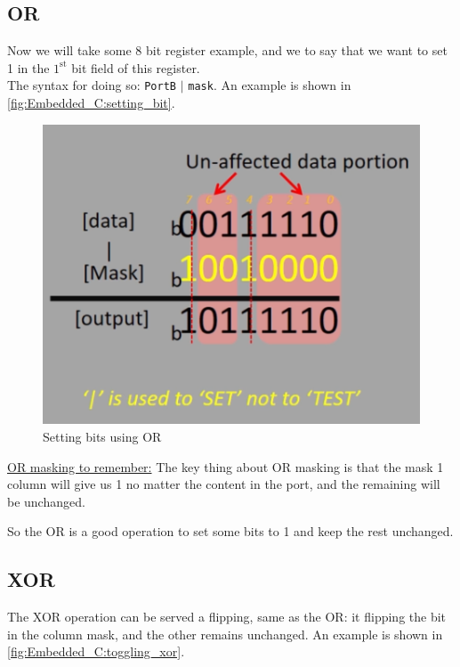 \newpage
\subsection{OR}

Now we will take some 8 bit register example, and we to say that we want to set 1 in the $\mathrm{1}^\mathrm{st}$ bit field of this register.\\

The syntax for doing so: \verb|PortB| $|$ \verb|mask|. An example is shown in \autoref{fig:Embedded_C:setting_bit}. 

\begin{figure}[h]
\centering
\includegraphics[scale=0.7]{Figures/Embedded_C/setting_bit}
\caption{Setting bits using OR}
\label{fig:Embedded_C:setting_bit}
\end{figure} 



\underline{OR masking to remember:} The key thing about OR masking is that the mask 1 column will give us 1 no matter the content in the port, and the remaining will be unchanged.

So the OR is a good operation to set some bits to 1 and keep the rest unchanged.

\subsection{XOR}

The XOR operation can be served a flipping, same as the OR: it flipping the bit in the column mask, and the other remains unchanged. An example is shown in \autoref{fig:Embedded_C:toggling_xor}.

